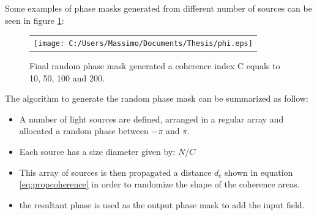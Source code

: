 Some examples of phase masks generated from different number of sources can be seen in figure \ref{fig:phasemask3}:
\begin{figure}[H]
	\begin{center}
		\begin{tabular}{c}
			\texttt{[image: C:/Users/Massimo/Documents/Thesis/phi.eps]}
		\end{tabular}
	\end{center}
	\caption{ \label{fig:phasemask3} 
		Final random phase mask generated a coherence index C equals to 10, 50, 100 and 200. }
\end{figure} 
The algorithm to generate the random phase mask can be summarized as follow:
\begin{itemize}
\item A number of light sources are defined, arranged in a regular array and allocated a random phase between $-\pi$ and $\pi$. 
 \item Each source has a size diameter given by: $N/C$
 \item This array of sources is then propagated a distance $d_c$ shown in equation \ref{eq:propcoherence} in order to randomize the shape of the coherence areas.
 \item the resultant phase is used as the output phase mask to add the input field.
\end{itemize}
\newpage
